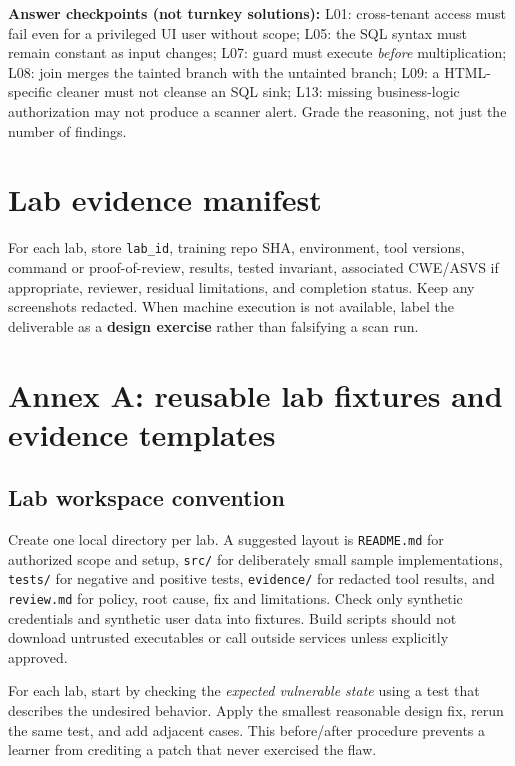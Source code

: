 \documentclass[
  letterpaper,
]{article}
\begin{document}
\textbf{Answer checkpoints (not turnkey solutions):} L01: cross-tenant
access must fail even for a privileged UI user without scope; L05: the
SQL syntax must remain constant as input changes; L07: guard must
execute \emph{before} multiplication; L08: join merges the tainted
branch with the untainted branch; L09: a HTML-specific cleaner must not
cleanse an SQL sink; L13: missing business-logic authorization may not
produce a scanner alert. Grade the reasoning, not just the number of
findings.

\section{Lab evidence manifest}\label{lab-evidence-manifest}

For each lab, store \texttt{lab\_id}, training repo SHA, environment,
tool versions, command or proof-of-review, results, tested invariant,
associated CWE/ASVS if appropriate, reviewer, residual limitations, and
completion status. Keep any screenshots redacted. When machine execution
is not available, label the deliverable as a \textbf{design exercise}
rather than falsifying a scan run.

\section{Annex A: reusable lab fixtures and evidence
templates}\label{annex-a-reusable-lab-fixtures-and-evidence-templates}

\subsection{Lab workspace convention}\label{lab-workspace-convention}

Create one local directory per lab. A suggested layout is
\texttt{README.md} for authorized scope and setup, \texttt{src/} for
deliberately small sample implementations, \texttt{tests/} for negative
and positive tests, \texttt{evidence/} for redacted tool results, and
\texttt{review.md} for policy, root cause, fix and limitations. Check
only synthetic credentials and synthetic user data into fixtures. Build
scripts should not download untrusted executables or call outside
services unless explicitly approved.

For each lab, start by checking the \emph{expected vulnerable state}
using a test that describes the undesired behavior. Apply the smallest
reasonable design fix, rerun the same test, and add adjacent cases. This
before/after procedure prevents a learner from crediting a patch that
never exercised the flaw.
\end{document}
